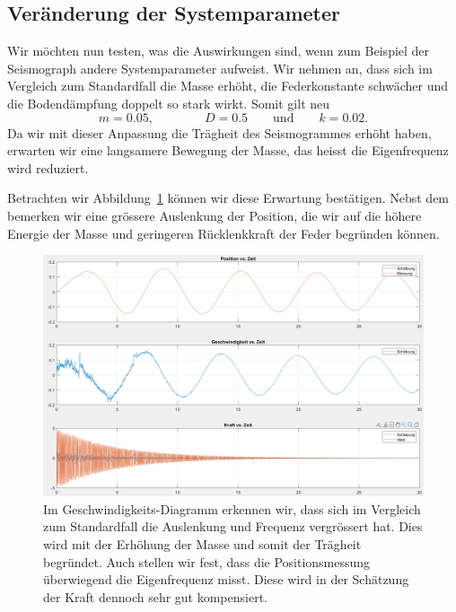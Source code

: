 \subsection{Veränderung der Systemparameter}
Wir möchten nun testen, was die Auswirkungen sind, wenn zum Beispiel der Seismograph andere Systemparameter aufweist.
Wir nehmen an, dass sich im Vergleich zum Standardfall die Masse erhöht, die Federkonstante schwächer und die Bodendämpfung doppelt so stark wirkt.
Somit gilt neu
\[
m = 0.05,
\qquad \qquad
D = 0.5
\qquad \text{und} \qquad
k = 0.02.
\]
Da wir mit dieser Anpassung die Trägheit des Seismogrammes erhöht haben,
erwarten wir eine langsamere Bewegung der Masse, das heisst die Eigenfrequenz wird reduziert.

Betrachten wir Abbildung~\ref{erdbeben:fig:systemparameter-geaendert} können wir diese Erwartung bestätigen.
Nebst dem bemerken wir eine grössere Auslenkung der Position, die wir auf die höhere Energie der Masse und geringeren Rücklenkkraft der Feder begründen können.

\begin{figure}
  \begin{center}
    \includegraphics[width=\linewidth,keepaspectratio]{papers/erdbeben/Systemparameter_geaendert.PNG}
      \caption{
        Im Geschwindigkeits-Diagramm erkennen wir,
        dass sich im Vergleich zum Standardfall die Auslenkung und Frequenz vergrössert hat.
        Dies wird mit der Erhöhung der Masse und somit der Trägheit begründet.
        Auch stellen wir fest, dass die Positionsmessung überwiegend die Eigenfrequenz misst.
        Diese wird in der Schätzung der Kraft dennoch sehr gut kompensiert.
      }
    \label{erdbeben:fig:systemparameter-geaendert}
  \end{center}
\end{figure}


